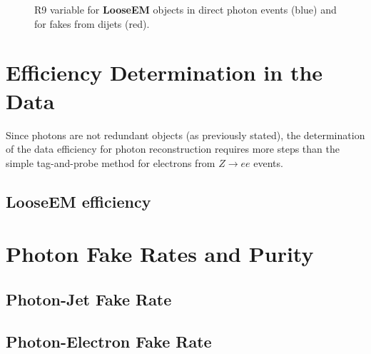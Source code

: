 \documentclass{cmspaper}
\begin{document}
\begin{figure}[hbtp]
  \begin{center}
    \caption{R9 variable for {\bf LooseEM} objects in direct photon events (blue) and for fakes from dijets (red).}
    \label{fig:Photonid_r9}
  \end{center}
\end{figure}

\section{Efficiency Determination in the Data}
Since photons are not redundant objects (as previously stated), the determination of the data efficiency for photon reconstruction requires more steps than the simple tag-and-probe method for electrons from $Z\rightarrow ee$ events.

\subsection{LooseEM efficiency}\label{ssec:LooseEMEff}

\section{Photon Fake Rates and Purity}
\subsection{Photon-Jet Fake Rate}
\subsection{Photon-Electron Fake Rate}
\end{document}
